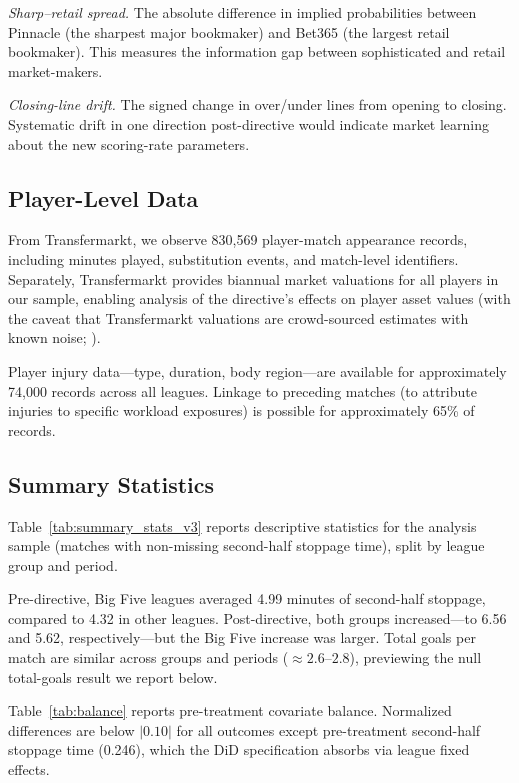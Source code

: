 \documentclass[12pt]{article}
\begin{document}
\textit{Sharp--retail spread.} The absolute difference in implied probabilities between Pinnacle (the sharpest major bookmaker) and Bet365 (the largest retail bookmaker). This measures the information gap between sophisticated and retail market-makers.

\textit{Closing-line drift.} The signed change in over/under lines from opening to closing. Systematic drift in one direction post-directive would indicate market learning about the new scoring-rate parameters.

\subsection{Player-Level Data}

From Transfermarkt, we observe 830,569 player-match appearance records, including minutes played, substitution events, and match-level identifiers. Separately, Transfermarkt provides biannual market valuations for all players in our sample, enabling analysis of the directive's effects on player asset values (with the caveat that Transfermarkt valuations are crowd-sourced estimates with known noise; \citealp{herm2014market}).

Player injury data---type, duration, body region---are available for approximately 74,000 records across all leagues. Linkage to preceding matches (to attribute injuries to specific workload exposures) is possible for approximately 65\% of records.

\subsection{Summary Statistics}

Table~\ref{tab:summary_stats_v3} reports descriptive statistics for the analysis sample (matches with non-missing second-half stoppage time), split by league group and period.



Pre-directive, Big Five leagues averaged 4.99 minutes of second-half stoppage, compared to 4.32 in other leagues. Post-directive, both groups increased---to 6.56 and 5.62, respectively---but the Big Five increase was larger. Total goals per match are similar across groups and periods ($\approx 2.6$--$2.8$), previewing the null total-goals result we report below.

Table~\ref{tab:balance} reports pre-treatment covariate balance. Normalized differences \citep{imbens2009recent} are below $|0.10|$ for all outcomes except pre-treatment second-half stoppage time (0.246), which the DiD specification absorbs via league fixed effects.
\end{document}
